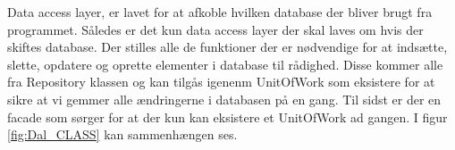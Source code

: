 


Data access layer, er lavet for at afkoble hvilken database der bliver brugt fra programmet. Således er det kun data access layer der skal laves om hvis der skiftes database. Der stilles alle de funktioner der er nødvendige for at indsætte, slette, opdatere og oprette elementer i database til rådighed. Disse kommer alle fra Repository klassen og kan tilgås igenenm UnitOfWork som eksistere for at sikre at vi gemmer alle ændringerne i databasen på en gang. Til sidst er der en facade som sørger for at der kun kan eksistere et UnitOfWork ad gangen. I figur \ref{fig:Dal_CLASS} kan sammenhængen ses.
